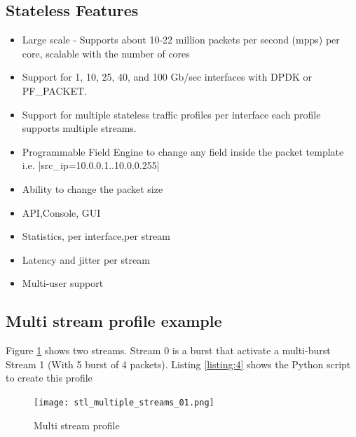 \documentclass[conference]{IEEEtran}
\begin{document}
\subsection{Stateless Features}

\begin{itemize}
  \item Large scale - Supports about 10-22 million packets per second (mpps) per core, scalable with the number of cores
  \item Support for 1, 10, 25, 40, and 100 Gb/sec interfaces with DPDK or PF\_PACKET.
  \item Support for multiple stateless traffic profiles per interface each profile supports multiple streams. 
  \item Programmable Field Engine to change any field inside the packet template i.e. |src_ip=10.0.0.1..10.0.0.255| 
  \item Ability to change the packet size 
  \item API,Console, GUI
  \item Statistics, per interface,per stream 
  \item Latency and jitter per stream
  \item Multi-user support 
\end{itemize}

\subsection{Multi stream profile example}


Figure \ref{fig:stlmulti} shows two streams. Stream 0 is a burst that activate a multi-burst Stream 1 (With 5 burst of 4 packets). 
Listing \ref{listing:4} shows the Python script to create this profile 

\begin{figure}[h]
  \texttt{[image: stl\_multiple\_streams\_01.png]}
  \caption{Multi stream profile}
  \label{fig:stlmulti}
\end{figure}
\end{document}
